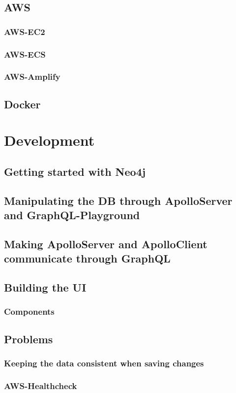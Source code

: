 \section{AWS}
\subsection{AWS-EC2}
\subsection{AWS-ECS}
\subsection{AWS-Amplify}
\section{Docker}

\chapter{Development}
\section{Getting started with Neo4j}
\section{Manipulating the DB through ApolloServer and GraphQL-Playground}
\section{Making ApolloServer and ApolloClient communicate through GraphQL}
\section{Building the UI}
\subsection{Components}
\section{Problems}
\subsection{Keeping the data consistent when saving changes}
\subsection{AWS-Healthcheck}
